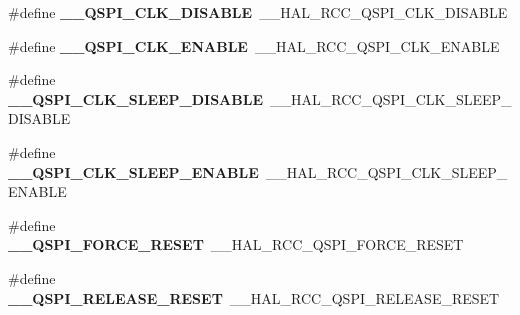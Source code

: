 \begin{DoxyCompactItemize}
\item 
\hypertarget{group___h_a_l___r_c_c___aliased_gade92ff9561e889107d8daba67473989a}{\#define {\bfseries \-\_\-\-\_\-\-Q\-S\-P\-I\-\_\-\-C\-L\-K\-\_\-\-D\-I\-S\-A\-B\-L\-E}~\-\_\-\-\_\-\-H\-A\-L\-\_\-\-R\-C\-C\-\_\-\-Q\-S\-P\-I\-\_\-\-C\-L\-K\-\_\-\-D\-I\-S\-A\-B\-L\-E}\label{group___h_a_l___r_c_c___aliased_gade92ff9561e889107d8daba67473989a}

\item 
\hypertarget{group___h_a_l___r_c_c___aliased_gadd658ac1a5f1b0813b14856fd20e2cdb}{\#define {\bfseries \-\_\-\-\_\-\-Q\-S\-P\-I\-\_\-\-C\-L\-K\-\_\-\-E\-N\-A\-B\-L\-E}~\-\_\-\-\_\-\-H\-A\-L\-\_\-\-R\-C\-C\-\_\-\-Q\-S\-P\-I\-\_\-\-C\-L\-K\-\_\-\-E\-N\-A\-B\-L\-E}\label{group___h_a_l___r_c_c___aliased_gadd658ac1a5f1b0813b14856fd20e2cdb}

\item 
\hypertarget{group___h_a_l___r_c_c___aliased_gaef3881596e019f17e7b5deb7d6d47937}{\#define {\bfseries \-\_\-\-\_\-\-Q\-S\-P\-I\-\_\-\-C\-L\-K\-\_\-\-S\-L\-E\-E\-P\-\_\-\-D\-I\-S\-A\-B\-L\-E}~\-\_\-\-\_\-\-H\-A\-L\-\_\-\-R\-C\-C\-\_\-\-Q\-S\-P\-I\-\_\-\-C\-L\-K\-\_\-\-S\-L\-E\-E\-P\-\_\-\-D\-I\-S\-A\-B\-L\-E}\label{group___h_a_l___r_c_c___aliased_gaef3881596e019f17e7b5deb7d6d47937}

\item 
\hypertarget{group___h_a_l___r_c_c___aliased_ga09ad8fbbc31c661c5db651cfec1836ee}{\#define {\bfseries \-\_\-\-\_\-\-Q\-S\-P\-I\-\_\-\-C\-L\-K\-\_\-\-S\-L\-E\-E\-P\-\_\-\-E\-N\-A\-B\-L\-E}~\-\_\-\-\_\-\-H\-A\-L\-\_\-\-R\-C\-C\-\_\-\-Q\-S\-P\-I\-\_\-\-C\-L\-K\-\_\-\-S\-L\-E\-E\-P\-\_\-\-E\-N\-A\-B\-L\-E}\label{group___h_a_l___r_c_c___aliased_ga09ad8fbbc31c661c5db651cfec1836ee}

\item 
\hypertarget{group___h_a_l___r_c_c___aliased_ga65b316ad66777e7a13f89e3bb6d6cd7e}{\#define {\bfseries \-\_\-\-\_\-\-Q\-S\-P\-I\-\_\-\-F\-O\-R\-C\-E\-\_\-\-R\-E\-S\-E\-T}~\-\_\-\-\_\-\-H\-A\-L\-\_\-\-R\-C\-C\-\_\-\-Q\-S\-P\-I\-\_\-\-F\-O\-R\-C\-E\-\_\-\-R\-E\-S\-E\-T}\label{group___h_a_l___r_c_c___aliased_ga65b316ad66777e7a13f89e3bb6d6cd7e}

\item 
\hypertarget{group___h_a_l___r_c_c___aliased_gac6cfbe77cce17109359af09ea38d6650}{\#define {\bfseries \-\_\-\-\_\-\-Q\-S\-P\-I\-\_\-\-R\-E\-L\-E\-A\-S\-E\-\_\-\-R\-E\-S\-E\-T}~\-\_\-\-\_\-\-H\-A\-L\-\_\-\-R\-C\-C\-\_\-\-Q\-S\-P\-I\-\_\-\-R\-E\-L\-E\-A\-S\-E\-\_\-\-R\-E\-S\-E\-T}\label{group___h_a_l___r_c_c___aliased_gac6cfbe77cce17109359af09ea38d6650}


\end{DoxyCompactItemize}
